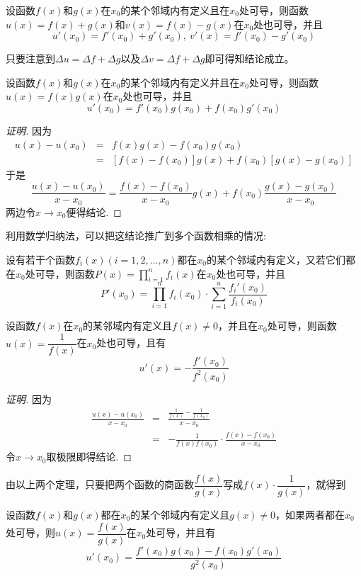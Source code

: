 \begin{theorem}
  设函数$f(x)$和$g(x)$在$x_0$的某个邻域内有定义且在$x_0$处可导，则函数$u(x)=f(x)+g(x)$和$v(x)=f(x)-g(x)$在$x_0$处也可导，并且
  \[ u'(x_0)=f'(x_0)+g'(x_0), \  v'(x)=f'(x_0)-g'(x_0) \]
\end{theorem}

只要注意到$\Delta u=\Delta f+\Delta g$以及$\Delta v=\Delta f+ \Delta g$即可得知结论成立。

\begin{theorem}
  设函数$f(x)$和$g(x)$在$x_0$的某个邻域内有定义并且在$x_0$处可导，则函数$u(x)=f(x)g(x)$在$x_0$处也可导，并且
  \[ u'(x_0)=f'(x_0)g(x_0)+f(x_0)g'(x_0) \]
\end{theorem}

\begin{proof}[证明]
  因为
  \begin{eqnarray*}
    u(x)-u(x_0) & = & f(x)g(x)-f(x_0)g(x_0) \\
                & = & [f(x)-f(x_0)]g(x)+f(x_0)[g(x)-g(x_0)]
  \end{eqnarray*}
  于是
  \[ \frac{u(x)-u(x_0)}{x-x_0} = \frac{f(x)-f(x_0)}{x-x_0}g(x)+f(x_0)\frac{g(x)-g(x_0)}{x-x_0} \]
  两边令$x \to x_0$便得结论.
\end{proof}

利用数学归纳法，可以把这结论推广到多个函数相乘的情况:
\begin{theorem}
  设有若干个函数$f_i(x)(i=1,2,\ldots,n)$都在$x_0$的某个邻域内有定义，又若它们都在$x_0$处可导，则函数$P(x)=\prod\limits_{i=1}^nf_i(x)$在$x_0$处也可导，并且
  \[ P'(x_0) = \prod_{i=1}^nf_i(x_0) \cdot \sum_{i=1}^n \frac{f_i'(x_0)}{f_i(x_0)} \]
\end{theorem}

\begin{theorem}
  设函数$f(x)$在$x_0$的某邻域内有定义且$f(x) \neq 0$，并且在$x_0$处可导，则函数$u(x)=\dfrac{1}{f(x)}$在$x_0$处也可导，且有
  \[ u'(x) = -\frac{f'(x_0)}{f^2(x_0)} \]
\end{theorem}

\begin{proof}[证明]
  因为
  \begin{eqnarray*}
    \frac{u(x)-u(x_0)}{x-x_0} & = & \frac{\frac{1}{f(x)}-\frac{1}{f(x_0)}}{x-x_0} \\
    & = & - \frac{1}{f(x)f(x_0)} \cdot \frac{f(x)-f(x_0)}{x-x_0}
  \end{eqnarray*}
  令$x \to x_0$取极限即得结论.
\end{proof}

由以上两个定理，只要把两个函数的商函数$\dfrac{f(x)}{g(x)}$写成$f(x)\cdot \dfrac{1}{g(x)}$，就得到
\begin{theorem}
  设函数$f(x)$和$g(x)$都在$x_0$的某个邻域内有定义且$g(x)\neq 0$，如果两者都在$x_0$处可导，则$u(x)=\dfrac{f(x)}{g(x)}$在$x_0$处可导，并且有
  \[ u'(x_0) = \frac{f'(x_0)g(x_0)-f(x_0)g'(x_0)}{g^2(x_0)} \]
\end{theorem}

